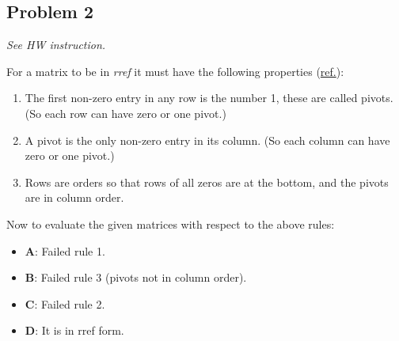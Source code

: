 \documentclass[11pt]{article}
\begin{document}
\subsection*{Problem 2}
\textit{See HW instruction.}\newline

For a matrix to be in \textit{rref} it must have the following properties (\href{https://www.math.fsu.edu/~bellenot/class/f08/lalab/other/rref2.pdf}{ref.}):

\begin{enumerate}
    \item The first non-zero entry in any row is the number 1, these are called pivots. (So each row can have zero or one pivot.)
    \item A pivot is the only non-zero entry in its column. (So each column can have zero or one pivot.)
    \item Rows are orders so that rows of all zeros are at the bottom, and the pivots are in column order.
\end{enumerate}

Now to evaluate the given matrices with respect to the above rules:

\begin{itemize}
    \item \textbf{A}: Failed rule 1.
    \item \textbf{B}: Failed rule 3 (pivots not in column order).
    \item \textbf{C}: Failed rule 2.
    \item \textbf{D}: It is in rref form.
\end{itemize}
\end{document}
